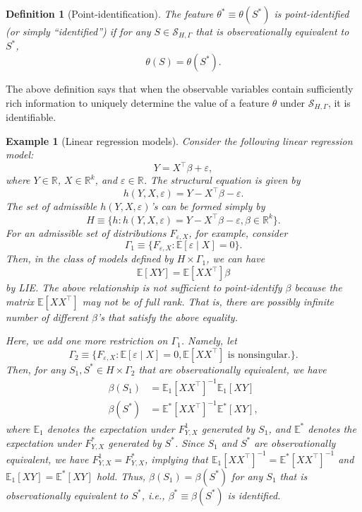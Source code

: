 \documentclass[10.5pt, A4paper, openany, uplatex]{book}
\newcommand{\mcl}{\mathcal}
\newcommand{\mbb}{\mathbb}
\newcommand{\eps}{\varepsilon}
\newcommand{\E}{\mathbb{E}}
\newtheorem{definition}[theorem]{Definition}
\newtheorem{example}[theorem]{Example}
\numberwithin{equation}{section}
\begin{document}
\begin{definition}[Point-identification] \label{def:identification}
	The feature $\theta^* \equiv \theta(S^*)$ is point-identified (or simply ``identified'') if for any $S \in \mcl{S}_{H,\Gamma}$ that is observationally equivalent to $S^*$,
	\[
	\theta(S) = \theta(S^*).
	\]
\end{definition}
The above definition says that when the observable variables contain sufficiently rich information to uniquely determine the value of a feature $\theta$ under $\mcl{S}_{H,\Gamma}$, it is identifiable.

\begin{example}[Linear regression models]\upshape
	Consider the following linear regression model:
	\[
		Y = X^\top \beta + \eps,
	\]
	where $Y \in \mbb{R}$, $X \in \mbb{R}^k$, and $\eps \in \mbb{R}$.
	The structural equation is given by
	\[
	 	h(Y, X, \eps) = Y - X^\top \beta - \eps.
	\]
	The set of admissible $h(Y, X, \eps)$'s can be formed simply by 
	\[
		H \equiv \{h : h(Y, X, \eps) = Y -X^\top \beta-\eps,  \beta \in \mbb{R}^k\}.	
	\]
	For an admissible set of distributions $F_{\eps,X}$, for example, consider 
	\[
		\Gamma_1 \equiv \{F_{\eps,X} : \E[\eps \mid X] = 0\}.
	\]
	Then, in the class of models defined by $H \times \Gamma_1$, we can have
	\[
	\E [XY ] = \E[XX^\top] \beta
	\]
	by LIE.
	The above relationship is not sufficient to point-identify $\beta$ because the matrix $\E [XX^\top]$ may not be of full rank.
	That is, there are possibly infinite number of different  $\beta$'s that satisfy the above equality.

	Here, we add one more restriction on $\Gamma_1$.
	Namely, let 
	\[
		\Gamma_2 \equiv \{F_{\eps,X} : \E[\eps \mid X] = 0, \E[XX^\top] \text{ is nonsingular.} \}.
	\]
	Then, for any $S_1, S^* \in H \times \Gamma_2$ that are observationally equivalent, we have
	\begin{align*}
	\beta(S_1) & = \E_1[XX^\top]^{-1} \E_1[XY ] \\
	\beta(S^*) & = \E^*[XX^\top]^{-1} \E^*[XY ],
	\end{align*}
	where $\E_1$ denotes the expectation under $F^1_{Y,X}$ generated by $S_1$, and $\E^*$ denotes the expectation under $F^*_{Y,X}$ generated by $S^*$.
	Since $S_1$ and $S^*$ are observationally equivalent, we have $F^1_{Y,X} = F^*_{Y,X}$, implying that $\E_1[XX^\top]^{-1} = \E^*[XX^\top]^{-1}$ and $\E_1[XY ] = \E^*[XY ]$ hold.
	Thus,  $\beta(S_1) =  \beta(S^*)$ for any $S_1$ that is observationally equivalent to $S^*$, i.e.,  $\beta^* \equiv \beta(S^*)$ is identified.
\end{example}
\end{document}
